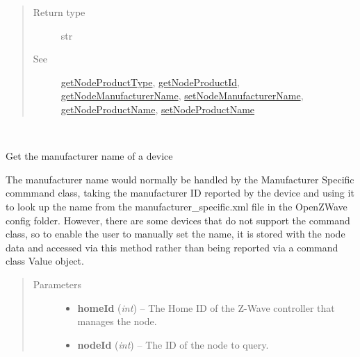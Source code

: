 \documentclass[letterpaper,10pt,english]{sphinxmanual}
\begin{document}
\begin{fulllineitems}
\begin{fulllineitems}
\begin{quote}
\begin{description}
\item[{Return type}] \leavevmode
str

\item[{See}] \leavevmode
{\hyperref[libopenzwave:getnodeproducttype]{getNodeProductType}}, {\hyperref[libopenzwave:getnodeproductid]{getNodeProductId}}, {\hyperref[libopenzwave:getnodemanufacturername]{getNodeManufacturerName}}, {\hyperref[libopenzwave:setnodemanufacturername]{setNodeManufacturerName}},     {\hyperref[libopenzwave:getnodeproductname]{getNodeProductName}}, {\hyperref[libopenzwave:setnodeproductname]{setNodeProductName}}

\end{description}\end{quote}

\end{fulllineitems}


\begin{fulllineitems}
\label{libopenzwave:libopenzwave.PyManager.getNodeManufacturerName}~\begin{quote}
\label{libopenzwave:getnodemanufacturername}\end{quote}

Get the manufacturer name of a device

The manufacturer name would normally be handled by the Manufacturer Specific
commmand class, taking the manufacturer ID reported by the device and using it
to look up the name from the manufacturer\_specific.xml file in the OpenZWave
config folder.  However, there are some devices that do not support the command
class, so to enable the user to manually set the name, it is stored with the
node data and accessed via this method rather than being reported via a command
class Value object.
\begin{quote}\begin{description}
\item[{Parameters}] \leavevmode\begin{itemize}
\item {} 
\textbf{homeId} (\emph{int}) -- The Home ID of the Z-Wave controller that manages the node.

\item {} 
\textbf{nodeId} (\emph{int}) -- The ID of the node to query.

\end{itemize}


\end{description}
\end{quote}
\end{fulllineitems}
\end{fulllineitems}
\end{document}
